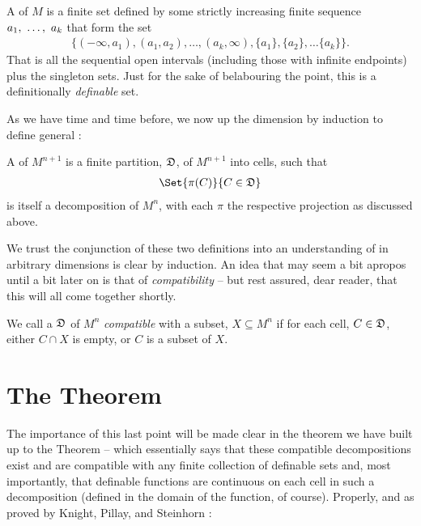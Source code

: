 \begin{definition}[\CD \emph{of $M$}]
  A \emph{\cd} of $M$ is a finite set defined by some strictly increasing finite sequence $a_1, \ \hdots, \ a_k$ that form the set
  \begin{align*}
    \{(- \infty, a_1), (a_1, a_2), \hdots, (a_k, \infty), \{a_1\}, \{a_2\}, \hdots \{a_k\} \}.
  \end{align*}
  That is all the sequential open intervals (including those with infinite endpoints) plus the singleton sets. Just for the sake of belabouring the point, this is a definitionally \emph{definable} set.
\end{definition}

As we have time and time before, we now up the dimension by induction to define general \cds:

\begin{definition}[\CD \emph{of $M^{n+1}$}]
  A \cd of $M^{n+1}$ is a finite partition, $\mathfrak{D}$, of $M^{n+1}$ into cells, such that
  \begin{align*}
    \Set{\pi (C)}{C \in \fancyD}
  \end{align*}
  is itself a decomposition of $M^n$, with each $\pi$ the respective projection as discussed above.
\end{definition}


We trust the conjunction of these two definitions into an understanding of \cds in arbitrary dimensions is clear by induction.
An idea that may seem a bit apropos until a bit later on is that of \emph{compatibility} -- but rest assured, dear reader, that this will all come together shortly.

\begin{definition}[Compatibility]
  We call a \cd $\mathfrak{D}$ of $M^n$ \emph{compatible} with a subset, $X \subseteq M^n$ if for each cell, $C \in \mathfrak{D}$, either $C \cap X$ is empty, or $C$ is a subset of $X$.
\end{definition}


\section{The \CD Theorem}

The importance of this last point will be made clear in the theorem we have built up to the \CD Theorem -- which essentially says that these compatible decompositions exist and are compatible with any finite collection of definable sets and, most importantly, that definable functions are continuous on each cell in such a decomposition (defined in the domain of the function, of course). Properly, and as proved by Knight, Pillay, and Steinhorn \cite{knight_definable_1986}:

